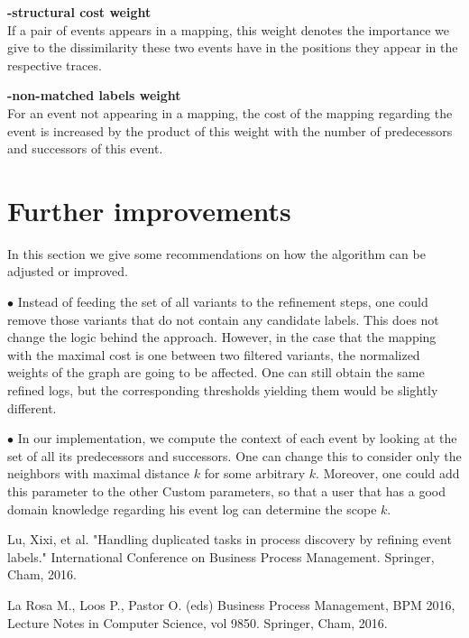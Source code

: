 \documentclass[notitlepage]{article}
\begin{document}
\begin{flushleft}
\textbf{-structural cost weight}\\
If a pair of events appears in a mapping, this weight denotes the importance we give to the dissimilarity these two events have in the positions they appear in the respective traces.
\medskip

\textbf{-non-matched labels weight}\\
For an event not appearing in a mapping, the cost of the mapping regarding the event is increased by the product of this weight with the number of predecessors and successors of this event.
\medskip


\section{Further improvements}
In this section we give some recommendations on how the algorithm can be adjusted or improved.
\medskip

$\bullet$
Instead of feeding the set of all variants to the refinement steps, one could remove those variants that do not contain any candidate labels.
This does not change the logic behind the approach.
However, in the case that the mapping with the maximal cost is one between two filtered variants, the normalized weights of the graph are going to be affected.
One can still obtain the same refined logs, but the corresponding thresholds yielding them would be slightly different.
\medskip

$\bullet$
In our implementation, we compute the context of each event by looking at the set of all its predecessors and successors.
One can change this to consider only the neighbors with maximal distance $k$ for some arbitrary $k$.
Moreover, one could add this parameter to the other Custom parameters, so that a user that has a good domain knowledge regarding his event log can determine the scope $k$.

\end{flushleft}
%



\begin{thebibliography}{5}
Lu, Xixi, et al. "Handling duplicated tasks in process discovery by refining event labels." International Conference on Business Process Management. Springer, Cham, 2016.

\bibitem{}
La Rosa M., Loos P., Pastor O. (eds) Business Process Management, BPM 2016, Lecture Notes in Computer Science, vol 9850. Springer, Cham, 2016.






\end{thebibliography}
\end{document}
